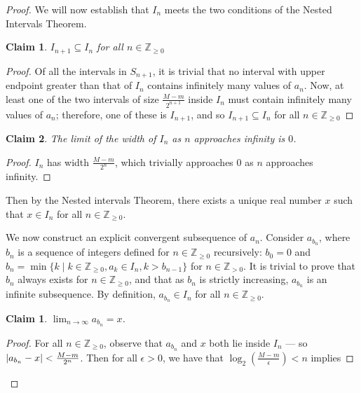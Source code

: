 \documentclass[11pt]{article}
\newtheorem{claim}{Claim}
\newtheorem*{claim*}{Claim}
\begin{document}
\begin{proof}
\newpage

We will now establish that $I_n$ meets the two conditions of the Nested Intervals Theorem. 

\begin{adjustwidth}{1cm}{}
	\begin{claim}
		$I_{n+1} \subseteq I_n$ for all $n \in \mathbb{Z}_{\ge 0}$
	\end{claim}
	\begin{proof}\renewcommand{\qedsymbol}{}
		Of all the intervals in $S_{n+1}$, it is trivial that no interval with upper endpoint greater than that of $I_n$ contains infinitely many values of $a_n$. Now, at least one of the two intervals of size $\tfrac{M-m}{2^{n+1}}$ inside $I_n$ must contain infinitely many values of $a_n$; therefore, one of these is $I_{n+1}$, and so $I_{n+1} \subseteq I_{n}$ for all $n \in \mathbb{Z}_{\ge 0}$ 
	\end{proof}
	\begin{claim}
		The limit of the width of $I_n$ as $n$ approaches infinity is $0$.
	\end{claim}
	\begin{proof}\renewcommand{\qedsymbol}{}
		$I_n$ has width $\tfrac{M-m}{2^{n}}$, which trivially approaches $0$ as $n$ approaches infinity.
	\end{proof}
\end{adjustwidth}

Then by the Nested intervals Theorem, there exists a unique real number $x$ such that $x \in I_{n}$ for all $n \in \mathbb{Z}_{\ge 0}$. 

We now construct an explicit convergent subsequence of $a_n$. Consider $a_{b_{n}}$, where $b_{n}$ is a sequence of integers defined for $n \in \mathbb{Z}_{\ge 0}$ recursively: $b_0 = 0$ and $b_n = \min \{ k \mid k \in \mathbb{Z}_{\ge 0}, a_k \in I_n, k > b_{n-1} \}$ for $n \in \mathbb{Z}_{>0}$. It is trivial to prove that $b_{n}$ always exists for $n \in \mathbb{Z}_{\ge 0}$, and that as $b_n$ is strictly increasing, $a_{b_{n}}$ is an infinite subsequence. By definition, $a_{b_{n}} \in I_n$ for all $n \in \mathbb{Z}_{\ge 0}$.

\begin{adjustwidth}{1cm}{}
	\begin{claim*}
		$\displaystyle{\lim_{n \to \infty}} a_{b_{n}} = x$.
	\end{claim*}
	\begin{proof}\renewcommand{\qedsymbol}{}
		For all $n \in \mathbb{Z}_{\ge 0}$, observe that $a_{b_{n}}$ and $x$ both lie inside $I_n$ --- so $\abs{a_{b_{n}} - x} < \tfrac{M-m}{2^{n}}$. Then for all $\epsilon > 0$, we have that $\log_2 (\tfrac{M-m}{\epsilon}) < n$ implies
		

\end{proof}
\end{adjustwidth}
\end{proof}
\end{document}
